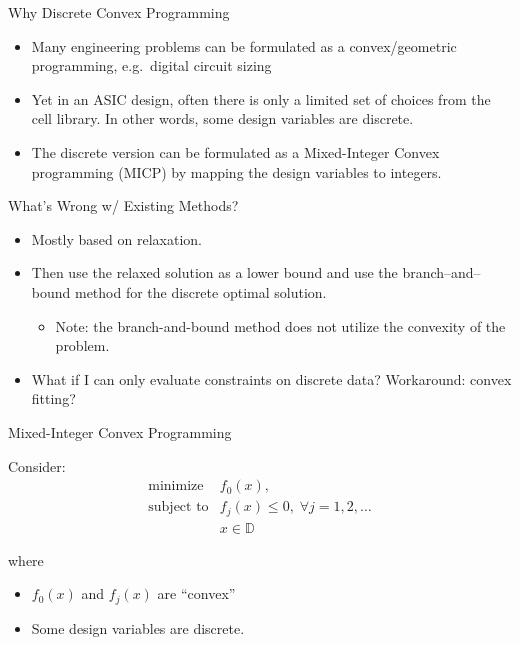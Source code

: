 \documentclass[10pt,ignorenonframetext,serif,onlymath]{beamer}
\providecommand{\tightlist}{%
  \setlength{\itemsep}{0pt}\setlength{\parskip}{0pt}}
\begin{document}
\begin{frame}{Why Discrete Convex Programming}
\protect\hypertarget{why-discrete-convex-programming}{}

\begin{itemize}
\item
  Many engineering problems can be formulated as a convex/geometric
  programming, e.g.~digital circuit sizing
\item
  Yet in an ASIC design, often there is only a limited set of choices
  from the cell library. In other words, some design variables are
  discrete.
\item
  The discrete version can be formulated as a Mixed-Integer Convex
  programming (MICP) by mapping the design variables to integers.
\end{itemize}

\end{frame}

\begin{frame}{What’s Wrong w/ Existing Methods?}
\protect\hypertarget{whats-wrong-w-existing-methods}{}

\begin{itemize}
\item
  Mostly based on relaxation.
\item
  Then use the relaxed solution as a lower bound and use the
  branch–and–bound method for the discrete optimal solution.

  \begin{itemize}
  \tightlist
  \item
    Note: the branch-and-bound method does not utilize the convexity of
    the problem.
  \end{itemize}
\item
  What if I can only evaluate constraints on discrete data? Workaround:
  convex fitting?
\end{itemize}

\end{frame}

\begin{frame}{Mixed-Integer Convex Programming}
\protect\hypertarget{mixed-integer-convex-programming}{}

Consider: \[\begin{array}{ll}
        \text{minimize}      & f_0(x), \\
        \text{subject to}    & f_j(x) \leq 0, \; \forall j=1,2,\ldots \\
                             & x \in \mathbb{D} 
\end{array}\]

where

\begin{itemize}
\tightlist
\item
  \(f_0(x)\) and \(f_j(x)\) are “convex”
\item
  Some design variables are discrete.
\end{itemize}

\end{frame}
\end{document}
